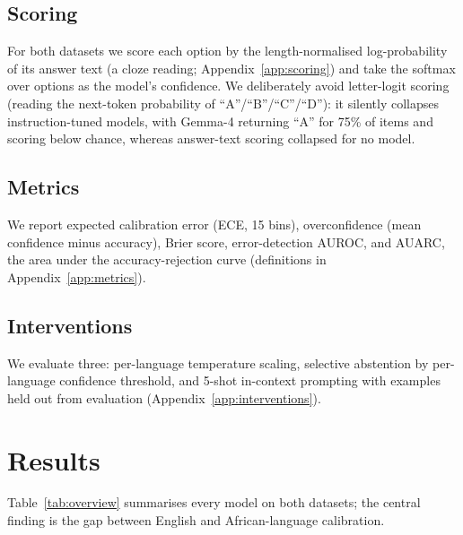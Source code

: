\documentclass[11pt]{article}
\begin{document}
\subsection{Scoring}
For both datasets we score each option by the length-normalised log-probability of its answer text
(a cloze reading; Appendix~\ref{app:scoring}) and take the softmax over options as the model's
confidence. We deliberately avoid letter-logit scoring (reading the next-token probability of
``A''/``B''/``C''/``D''): it silently collapses instruction-tuned models, with Gemma-4 returning
``A'' for 75\% of items and scoring below chance, whereas answer-text scoring collapsed for no model.

\subsection{Metrics}
We report expected calibration error (ECE, 15 bins), overconfidence (mean confidence minus accuracy),
Brier score, error-detection AUROC, and AUARC, the area under the accuracy-rejection curve
(definitions in Appendix~\ref{app:metrics}).

\subsection{Interventions}
We evaluate three: per-language temperature scaling, selective abstention by per-language confidence
threshold, and 5-shot in-context prompting with examples held out from evaluation
(Appendix~\ref{app:interventions}).

\section{Results}
Table~\ref{tab:overview} summarises every model on both datasets; the central finding is the gap
between English and African-language calibration.
\end{document}
